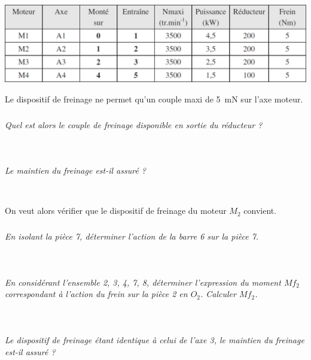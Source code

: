 \documentclass[10pt,fleqn]{article} %
\begin{document}
\begin{multicols}{2}
\begin{corrige}
\end{corrige}
\else
\fi

\begin{center}
\includegraphics[width=\linewidth]{images/fig_03}
\end{center}

Le dispositif de freinage ne permet qu’un couple maxi de \SI{5}{mN} sur l’axe moteur.

\subparagraph{}\textit{Quel est alors le couple de freinage disponible en sortie du réducteur ?}
\ifprof
\begin{corrige}~\\

\end{corrige}
\else
\fi


\subparagraph{}\textit{Le maintien du freinage est-il assuré ? }
\ifprof
\begin{corrige}~\\

\end{corrige}
\else
\fi
 
 On veut alors vérifier que le dispositif de freinage du moteur $M_2$ convient.

\subparagraph{}\textit{En isolant la pièce 7, déterminer l’action de la barre 6 sur la pièce 7.}
\ifprof
\begin{corrige}~\\

\end{corrige}
\else
\fi
 

\subparagraph{}\textit{En considérant l’ensemble 2, 3, 4, 7, 8, déterminer l’expression du moment $Mf_2$
correspondant à l’action du frein sur la pièce 2 en $O_2$. Calculer $Mf_2$. }
\ifprof
\begin{corrige}~\\

\end{corrige}
\else
\fi
 

\subparagraph{}\textit{Le dispositif de freinage étant identique à celui de l’axe 3, le maintien du freinage
est-il assuré ?}
\ifprof
\begin{corrige}~\\

\end{corrige}
\else
\fi
 



\end{multicols}
\end{document}
